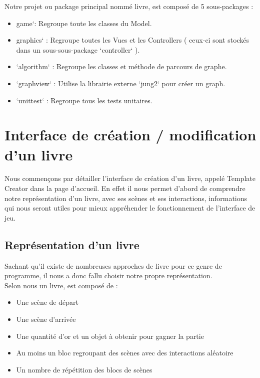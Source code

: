 \documentclass[12pt]{article}
\begin{document}
Notre projet ou package principal nommé livre, est composé de 5 sous-packages :\\
\begin{itemize}
    \item game`: Regroupe toute les classes du Model.\\
    \item graphics` : Regroupe toutes les Vues et les Controllers ( ceux-ci sont stockés dans un sous-sous-package `controller` ).\\
    \item `algorithm` : Regroupe les classes et méthode de parcours de graphe.\\
    \item `graphview` : Utilise la librairie externe `jung2` pour créer un graph.\\
    \item `unittest` : Regroupe tous les tests unitaires.\\
\end{itemize}

\section{Interface de création / modification d'un livre}
Nous commençons par détailler l'interface de création d'un livre, appelé Template Creator dans la page d'accueil. En effet il nous permet d'abord de comprendre notre représentation d'un livre, avec ses scènes et ses interactions, informations qui nous seront utiles pour mieux appréhender le fonctionnement de l'interface de jeu.

\subsection{Représentation d'un livre}
Sachant qu'il existe de nombreuses approches de livre pour ce genre de programme, il nous a donc fallu choisir notre propre représentation.\\
Selon nous un livre, est composé de :

\begin{itemize}
    \item Une scène de départ
    \item Une scène d'arrivée
    \item Une quantité d'or et un objet à obtenir pour gagner la partie
    \item Au moins un bloc regroupant des scènes avec des interactions aléatoire
    \item Un nombre de répétition des blocs de scènes\\
\end{itemize}
\end{document}
